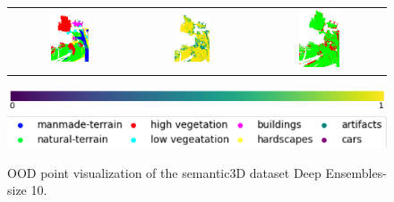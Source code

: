\begin{figure}[h!]
\begin{tabular}{ccc}
                \includegraphics[width=0.33\textwidth, height=0.18\textheight]{images/ood_imgs/fout_sem3d/fout_3.png} &
                \includegraphics[width=0.33\textwidth, height=0.18\textheight]{images/ood_imgs/fout_sem3d/fout_prob_3.png}& 
                \includegraphics[width=0.33\textwidth, height=0.18\textheight]{images/ood_imgs/fout_sem3d/fout_ood_auroc_3.png}\\
            \end{tabular}
            \includegraphics[scale=0.45]{images/prob_legend.pdf}
            \includegraphics[scale=0.65]{images/legend.png}
            \caption{OOD point visualization of the semantic3D dataset Deep Ensembles-size 10.}
            \label{fig:fout_ood_auroc_sem3d_prob}
        \end{figure}
